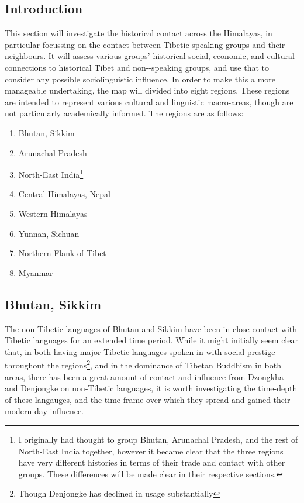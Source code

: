 \subsection{Introduction}
This section will investigate the historical contact across the Himalayas, in particular focussing on the contact between Tibetic-speaking groups and their neighbours. It will assess various groups' historical social, economic, and cultural connections to historical Tibet and non-\lfam-speaking groups, and use that to consider any possible sociolinguistic influence. In order to make this a more manageable undertaking, the map will divided into eight regions. These regions are intended to represent various cultural and linguistic macro-areas, though are not particularly academically informed. The regions are as follows:
\begin{enumerate}
    \item Bhutan, Sikkim
    \item Arunachal Pradesh 
    \item North-East India\footnote{I originally had thought to group Bhutan, Arunachal Pradesh, and the rest of North-East India together, however it became clear that the three regions have very different histories in terms of their trade and contact with other groups. These differences will be made clear in their respective sections.}
    \item Central Himalayas, Nepal
    \item Western Himalayas
    \item Yunnan, Sichuan
    \item Northern Flank of Tibet
    \item Myanmar
\end{enumerate}
\subsection{Bhutan, Sikkim}
The non-Tibetic languages of Bhutan and Sikkim have been in close contact with Tibetic languages for an extended time period. While it might initially seem clear that, in both having major Tibetic languages spoken in with social prestige throughout the regions\footnote{Though Denjongke has declined in usage substantially}, and in the dominance of Tibetan Buddhism in both areas, there has been a great amount of contact and influence from Dzongkha and Denjongke on non-Tibetic languages, it is worth investigating the time-depth of these langauges, and the time-frame over which they spread and gained their modern-day influence. 


